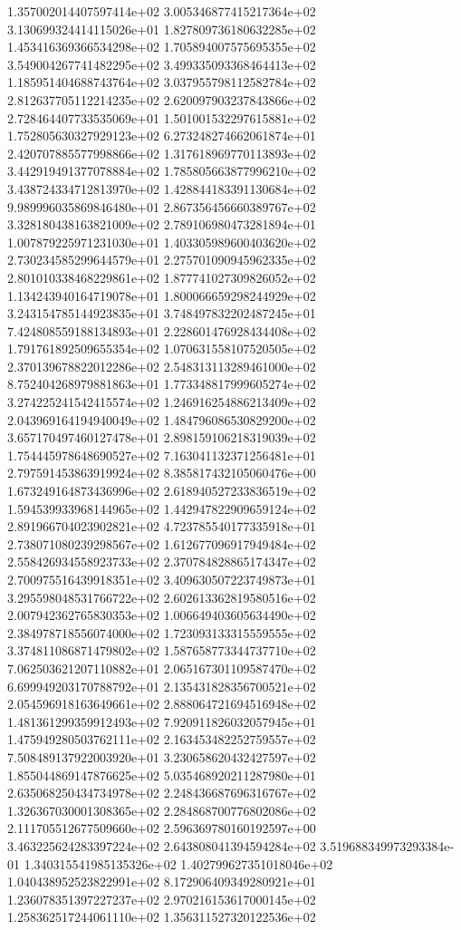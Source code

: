 1.357002014407597414e+02 3.005346877415217364e+02 3.130699324414115026e+01
1.827809736180632285e+02 1.453416369366534298e+02 1.705894007575695355e+02
3.549004267741482295e+02 3.499335093368464413e+02 1.185951404688743764e+02
3.037955798112582784e+02 2.812637705112214235e+02 2.620097903237843866e+02
2.728464407733535069e+01 1.501001532297615881e+02 1.752805630327929123e+02
6.273248274662061874e+01 2.420707885577998866e+02 1.317618969770113893e+02
3.442919491377078884e+02 1.785805663877996210e+02 3.438724334712813970e+02
1.428844183391130684e+02 9.989996035869846480e+01 2.867356456660389767e+02
3.328180438163821009e+02 2.789106980473281894e+01 1.007879225971231030e+01
1.403305989600403620e+02 2.730234585299644579e+01 2.275701090945962335e+02
2.801010338468229861e+02 1.877741027309826052e+02 1.134243940164719078e+01
1.800066659298244929e+02 3.243154785144923835e+01 3.748497832202487245e+01
7.424808559188134893e+01 2.228601476928434408e+02 1.791761892509655354e+02
1.070631558107520505e+02 2.370139678822012286e+02 2.548313113289461000e+02
8.752404268979881863e+01 1.773348817999605274e+02 3.274225241542415574e+02
1.246916254886213409e+02 2.043969164194940049e+02 1.484796086530829200e+02
3.657170497460127478e+01 2.898159106218319039e+02 1.754445978648690527e+02
7.163041132371256481e+01 2.797591453863919924e+02 8.385817432105060476e+00
1.673249164873436996e+02 2.618940527233836519e+02 1.594539933968144965e+02
1.442947822909659124e+02 2.891966704023902821e+02 4.723785540177335918e+01
2.738071080239298567e+02 1.612677096917949484e+02 2.558426934558923733e+02
2.370784828865174347e+02 2.700975516439918351e+02 3.409630507223749873e+01
3.295598048531766722e+02 2.602613362819580516e+02 2.007942362765830353e+02
1.006649403605634490e+02 2.384978718556074000e+02 1.723093133315559555e+02
3.374811086871479802e+02 1.587658773344737710e+02 7.062503621207110882e+01
2.065167301109587470e+02 6.699949203170788792e+01 2.135431828356700521e+02
2.054596918163649661e+02 2.888064721694516948e+02 1.481361299359912493e+02
7.920911826032057945e+01 1.475949280503762111e+02 2.163453482252759557e+02
7.508489137922003920e+01 3.230658620432427597e+02 1.855044869147876625e+02
5.035468920211287980e+01 2.635068250434734978e+02 2.248436687696316767e+02
1.326367030001308365e+02 2.284868700776802086e+02 2.111705512677509660e+02
2.596369780160192597e+00 3.463225624283397224e+02 2.643808041394594284e+02
3.519688349973293384e-01 1.340315541985135326e+02 1.402799627351018046e+02
1.040438952523822991e+02 8.172906409349280921e+01 1.236078351397227237e+02
2.970216153617000145e+02 1.258362517244061110e+02 1.356311527320122536e+02
